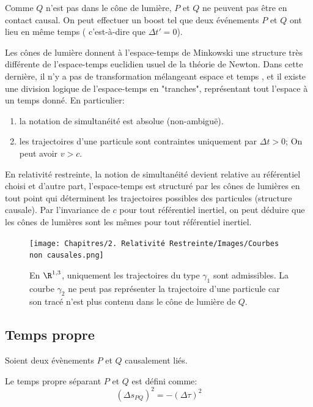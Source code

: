 {    Comme $Q$ n'est pas dans le cône de lumière, $P$ et $Q$ ne peuvent pas être en contact causal. On peut effectuer un boost tel que deux événements $P$ et $Q$ ont lieu en même temps ( c'est-à-dire que $\Delta t' = 0$). 

    Les cônes de lumière donnent à l'espace-temps de Minkowski une structure très différente de l'espace-temps euclidien usuel de la théorie de Newton. Dans cette dernière, il n'y a pas de transformation mélangeant espace et temps , et il existe une division logique de l'espace-temps en "tranches", représentant tout l'espace à un temps donné. En particulier:
    \begin{enumerate}
        \item la notation de simultanéité est absolue (non-ambiguë).
        \item les trajectoires d'une particule sont contraintes uniquement par $\Delta t> 0$; On peut avoir $v>c$.
    \end{enumerate}
    En relativité restreinte, la notion de simultanéité devient relative au référentiel choisi et d'autre part, l'espace-temps est structuré par les cônes de lumières en tout point qui déterminent les trajectoires possibles des particules (structure causale). Par l'invariance de $c$ pour tout référentiel inertiel, on peut déduire que les cônes de lumières sont les mêmes pour tout référentiel inertiel.
    \begin{figure}[H]
        \centering
        \texttt{[image: Chapitres/2. Relativité Restreinte/Images/Courbes non causales.png]}
        \caption{En $\R^{1,3}$, uniquement les trajectoires du type $\gamma_1$ sont admissibles. La courbe $\gamma_2$ ne peut pas représenter la trajectoire d'une particule car son tracé n'est plus contenu dans le cône de lumière de $Q$.}
        \label{fig:2.3}
    \end{figure}
\subsection{Temps propre}

Soient deux évènements $P$ et $Q$ causalement liés. 
\begin{theoremframe}
    \begin{defi}
        Le temps propre séparant $P$ et $Q$ est défini comme:
        \begin{equation}
            (\Delta s_{PQ})^2 = -(\Delta \tau)^2
        \end{equation}
    \end{defi}
\end{theoremframe}

}

